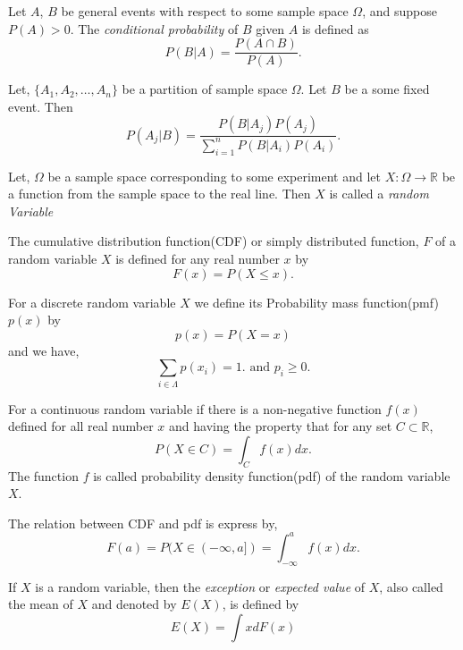\begin{definition}
	Let $A$, $B$ be general events with respect to some sample space $ \Omega $,
	and suppose $ P(A)>0 $. The \textit{conditional probability} of $ B $ given $ A $ is defined as 
	\[
		P(B|A) = \frac{P(A\cap B)}{P(A)}.
	\]
\end{definition}

\begin{theorem}
	Let, $ \{ A_1,A_2,\ldots,A_n \} $ be a partition of sample space $ \Omega $. 
	Let $ B $ be a some fixed event. Then
	\[
		P(A_j|B) = \frac{P(B|A_j)P(A_j)}{\sum_{i=1}^{n}P(B|A_i)P(A_i) }.
	\]
\end{theorem}

\begin{definition}
	Let, $ \Omega $ be a sample space corresponding to some experiment and let 
	$ X:\Omega\to \mathds{R} $ be a function from the sample space to the real line. 
	Then $ X $ is called a \textit{random Variable}
\end{definition}

\begin{definition}
	The cumulative distribution function(CDF) or simply distributed function, $ F $ of 
	a random variable $ X $ is defined for any real number $ x $ by
	\[
		F(x) = P(X \le x).
	\]
\end{definition}

\begin{definition}
	For a discrete random variable $ X $ we define its Probability mass function(pmf)
	$ p(x) $ by
	\[
		p(x) = P(X=x)
	\]
	and we have,
	\[
		\sum_{i\in \Lambda} p(x_i) = 1. \text{ and } p_i \ge 0. 
	\]
\end{definition}

\begin{definition}
	For a continuous random variable if there is a non-negative function $ f(x) $
	defined for all real number $ x $ and having the property that for any set $ C\subset \mathds{R} $,
	\[
		P(X\in C) = \int_{C}f(x) dx 
		.\]
	The function $ f $ is called probability density function(pdf) of the random variable $ X $.
\end{definition}

The relation between CDF and pdf is express by,
\[
	F(a) = P(X\in (-\infty, a]) = \int_{-\infty}^{a} f(x) dx.
\]

\begin{definition}[Expectation]
	If $ X $ is a random variable,
	then the \textit{exception} or \textit{expected value} of $ X $, also called the mean of $ X $ and denoted by $ E(X) $, is defined by
	\[
		E(X) = \int xdF(x) 
	\]
\end{definition}

